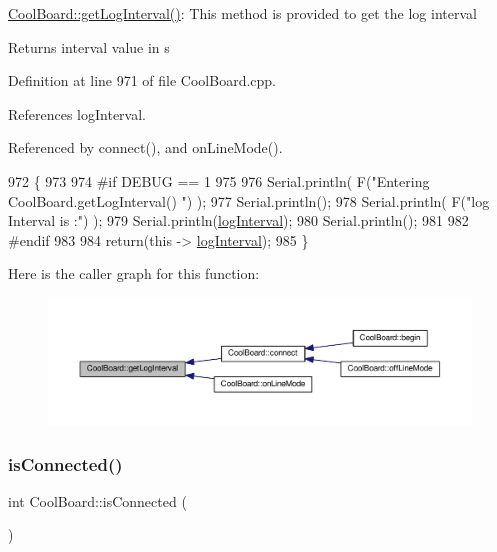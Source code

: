 \hyperlink{classCoolBoard_a7508e029f2ee17bb747ffab599285e0d}{Cool\+Board\+::get\+Log\+Interval()}\+: This method is provided to get the log interval

\begin{DoxyReturn}{Returns}
interval value in s 
\end{DoxyReturn}


Definition at line 971 of file Cool\+Board.\+cpp.



References log\+Interval.



Referenced by connect(), and on\+Line\+Mode().


\begin{DoxyCode}
972 \{
973 
974 \textcolor{preprocessor}{#if DEBUG == 1}
975 
976     Serial.println( F(\textcolor{stringliteral}{"Entering CoolBoard.getLogInterval() "}) );
977     Serial.println();
978     Serial.println( F(\textcolor{stringliteral}{"log Interval is :"}) );
979     Serial.println(\hyperlink{classCoolBoard_a84bc94413b64973e4aba8c467c97006c}{logInterval});
980     Serial.println();
981 
982 \textcolor{preprocessor}{#endif}
983 
984     \textcolor{keywordflow}{return}(\textcolor{keyword}{this} -> \hyperlink{classCoolBoard_a84bc94413b64973e4aba8c467c97006c}{logInterval});
985 \}
\end{DoxyCode}
Here is the caller graph for this function\+:
\nopagebreak
\begin{figure}[H]
\begin{center}
\leavevmode
\includegraphics[width=350pt]{classCoolBoard_a7508e029f2ee17bb747ffab599285e0d_icgraph}
\end{center}
\end{figure}
\mbox{\label{classCoolBoard_ad7442cf4b62c7b0d5bd62a0f75ffc065}} 
\subsubsection{\texorpdfstring{is\+Connected()}{isConnected()}}
{\footnotesize\ttfamily int Cool\+Board\+::is\+Connected (\begin{DoxyParamCaption}{ }\end{DoxyParamCaption})}


